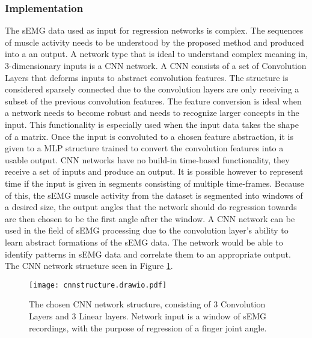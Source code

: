 \documentclass[../main.tex]{subfiles}
\begin{document}
\subsubsection{Implementation}

The sEMG data used as input for regression networks is complex.
The sequences of muscle activity needs to be understood by the proposed method and produced into a an output.
A network type that is ideal to understand complex meaning in, 3-dimensionary inputs is a CNN network.
A CNN consists of a set of Convolution Layers that deforms inputs to abstract convolution features.
The structure is considered sparsely connected due to the convolution layers are only receiving a subset of the previous convolution features.
The feature conversion is ideal when a network needs to become robust and needs to recognize larger concepts in the input.
This functionality is especially used when the input data takes the shape of a matrix.
Once the input is convoluted to a chosen feature abstraction, it is given to a MLP structure trained to convert the convolution features into a usable output.
CNN networks have no build-in time-based functionality, they receive a set of inputs and produce an output.
It is possible however to represent time if the input is given in segments consisting of multiple time-frames.
Because of this, the sEMG muscle activity from the dataset is segmented into windows of a desired size, the output angles that the network should do regression towards are then chosen to be the first angle after the window.
A CNN network can be used in the field of sEMG processing due to the convolution layer's ability to learn abstract formations of the sEMG data.
The network would be able to identify patterns in sEMG data and correlate them to an appropriate output.
The CNN network structure seen in Figure \ref{fig:cnn_structure}.

\begin{figure}[H]
\begin{center}
\texttt{[image: cnnstructure.drawio.pdf]}
\caption{The chosen CNN network structure, consisting of 3 Convolution Layers and 3 Linear layers. Network input is a window of sEMG recordings, with the purpose of regression of a finger joint angle.}
\label{fig:cnn_structure}
\end{center}
\end{figure}
\end{document}
